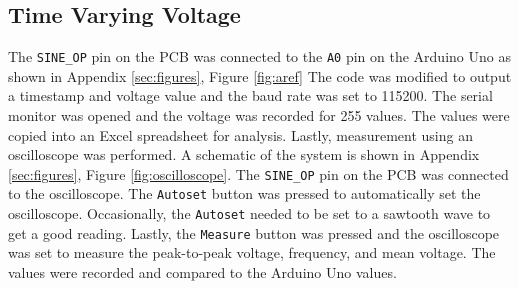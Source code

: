 \subsection{Time Varying Voltage}
\noindent The \texttt{SINE\_OP} pin on the PCB was connected to the \texttt{A0} pin on the Arduino Uno as shown in Appendix \ref{sec:figures}, Figure \ref{fig:aref}
The code was modified to output a timestamp and voltage value and the baud rate was set to 115200. The serial monitor was opened and the voltage was recorded for 255 values. The values were 
copied into an Excel spreadsheet for analysis.
Lastly, measurement using an oscilloscope was performed. A schematic of the system is shown in Appendix \ref{sec:figures}, Figure \ref{fig:oscilloscope}. 
The \texttt{SINE\_OP} pin on the PCB was connected to the oscilloscope.  The \texttt{Autoset} button was pressed to automatically set the oscilloscope. Occasionally,
the \texttt{Autoset} needed to be set to a sawtooth wave to get a good reading. Lastly, the \texttt{Measure} button was pressed and the oscilloscope was set to 
measure the peak-to-peak voltage, frequency, and mean voltage.  The values were recorded and compared to the Arduino Uno values.



